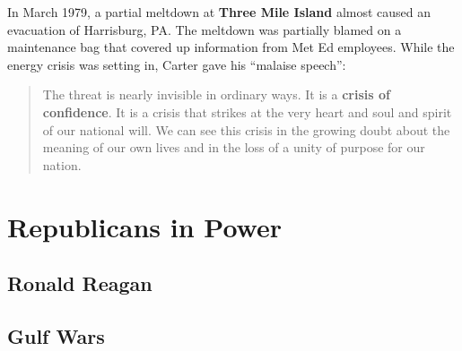 In March 1979, a partial meltdown at \textbf{Three Mile Island} almost caused an evacuation of Harrisburg, PA\@.
The meltdown was partially blamed on a maintenance bag that covered up information from Met Ed employees.
While the energy crisis was setting in, Carter gave his ``malaise speech'':
\begin{quote}
 The threat is nearly invisible in ordinary ways.
 It is a \textbf{crisis of confidence}.
 It is a crisis that strikes at the very heart and soul and spirit of our national will.
 We can see this crisis in the growing doubt about the meaning of our own lives
 and in the loss of a unity of purpose for our nation.
\end{quote}

\section{Republicans in Power}

\subsection*{Ronald Reagan}

\subsection*{Gulf Wars}
